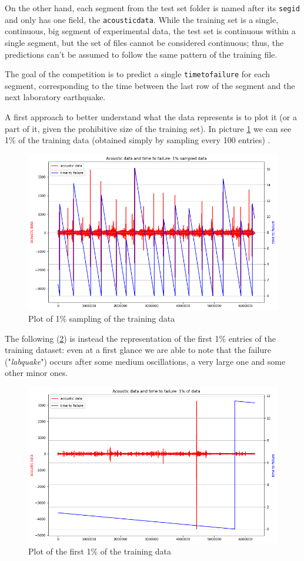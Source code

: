 On the other hand, each segment from the test set folder is named after its \texttt{seg\textunderscore id} and only has one field, the \texttt{acoustic\textunderscore data}.
While the training set is a single, continuous, big segment of experimental data, the test set is continuous within a single segment, but the set of files cannot be considered continuous; thus, the predictions can't be assumed to follow the same pattern of the training file.

The goal of the competition is to predict a single \texttt{time\textunderscore to\textunderscore failure} for each segment, corresponding to the time between the last row of the segment and the next laboratory earthquake.

\bigbreak

A first approach to better understand what the data represents is to plot it (or a part of it, given the prohibitive size of the training set). In picture \ref{fig:plot1} we can see 1\% of the training data (obtained simply by sampling every 100 entries) \cite{kernelpreda}.

\begin{figure} [h]
	\centering
	\includegraphics[width=0.7\linewidth]{pictures/plot1.png}
	\caption{Plot of 1\% sampling of the training data}
	\label{fig:plot1}
\end{figure}

The following (\ref{fig:plot2}) is instead the representation of the first 1\% entries of the training dataset: even at a first glance we are able to note that the failure ("\textit{labquake}") occurs after some medium oscillations, a very large one and some other minor ones. 

\begin{figure} [h]
	\centering
	\includegraphics[width=0.7\linewidth]{pictures/plot2.png}
	\caption{Plot of the first 1\% of the training data}
	\label{fig:plot2}
\end{figure}

